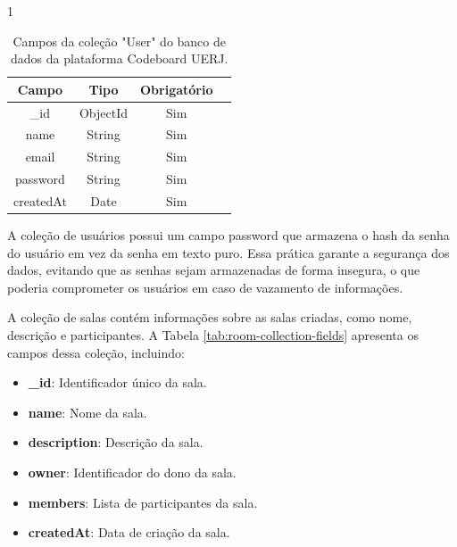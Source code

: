 \begin{table}[H]{1\textwidth}
    \centering
    \caption{Campos da coleção "User" do banco de dados da plataforma Codeboard UERJ.}
    \label{tab:user-collection-fields}
    \renewcommand{\arraystretch}{1.3} 
    \begin{tabular}{|c|c|c|c|}
        \hline
        \textbf{Campo}   & \textbf{Tipo} & \textbf{Obrigatório} \\
        \hline
        \_id            & ObjectId      & Sim                  \\
        \hline
        name              & String        & Sim                  \\
        \hline
        email              & String        & Sim                  \\
        \hline
        password         & String        & Sim                  \\
        \hline
        createdAt        & Date          & Sim                  \\
        \hline
    \end{tabular}
\end{table}

A coleção de usuários possui um campo password que armazena o hash da senha do usuário em vez da senha em texto puro. Essa prática garante a segurança dos dados, evitando que as senhas sejam armazenadas de forma insegura, o que poderia comprometer os usuários em caso de vazamento de informações.


A coleção de salas contém informações sobre as salas criadas, como nome, descrição e participantes. A Tabela \ref{tab:room-collection-fields} apresenta os campos dessa coleção, incluindo:

\begin{itemize}
    \item \textbf{\_id}: Identificador único da sala.
    \item \textbf{name}: Nome da sala.
    \item \textbf{description}: Descrição da sala.
    \item \textbf{owner}: Identificador do dono da sala.
    \item \textbf{members}: Lista de participantes da sala.
    \item \textbf{createdAt}: Data de criação da sala.
\end{itemize}

